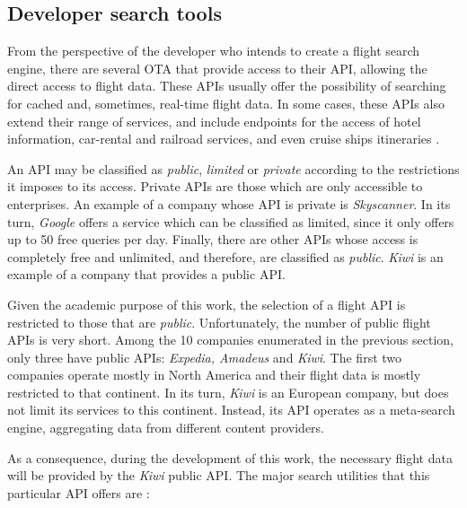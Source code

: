 \subsection{Developer search tools}
\label{sec:developer_st}

From the perspective of the developer who intends to create a flight search engine, there are several OTA that provide access to their \ac{API}, allowing the direct access to flight data. These APIs usually offer the possibility of searching for cached and, sometimes, real-time flight data. In some cases, these APIs also extend their range of services, and include endpoints for the access of hotel information, car-rental and railroad services, and even cruise ships itineraries \cite{expedia_docs, amadeus}.

An API may be classified as \textit{public}, \textit{limited} or \textit{private} according to the restrictions it imposes to its access. Private APIs are those which are only accessible to enterprises. An example of a company whose API is private is \textit{Skyscanner}. In its turn, \textit{Google} offers a service which can be classified as limited, since it only offers up to 50 free queries per day. Finally, there are other APIs whose access is completely free and unlimited, and therefore, are classified as \textit{public}. \textit{Kiwi} is an example of a company that provides a public API.

Given the academic purpose of this work, the selection of a flight API is restricted to those that are \textit{public}. Unfortunately, the number of public flight APIs is very short. Among the 10 companies enumerated in the previous section, only three have public APIs: \textit{Expedia, Amadeus} and \textit{Kiwi}. The first two companies operate mostly in North America and their flight data is mostly restricted to that continent. In its turn, \textit{Kiwi} is an European company, but does not limit its services to this continent. Instead, its API operates as a meta-search engine, aggregating data from different content providers. 

As a consequence, during the development of this work, the necessary flight data will be provided by the \textit{Kiwi} public API. The major search utilities that this particular API offers are \cite{kiwi_api}:

